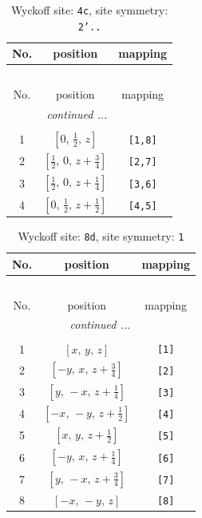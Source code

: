 \documentclass[fleqn,8pt]{jsarticle}
\begin{document}
\renewcommand{\arraystretch}{1.2}
\begin{longtable}{ccc}
\caption{Wyckoff site: {\tt 4c}, site symmetry: {\tt 2'..}}
 \\
 \hline \hline
No. & position & mapping \\ \hline \endfirsthead

\multicolumn{2}{l}{\tablename\ \thetable{}} \\
 \hline \hline
No. & position & mapping \\ \hline \endhead

 \hline \hline
\multicolumn{2}{r}{\footnotesize\it continued ...} \\ \endfoot

 \hline \hline
\multicolumn{2}{r}{} \\ \endlastfoot

1 & $\left[ 0,\, \frac{1}{2},\, z \right]$ & {\tt [1,8]} \\ \hline
2 & $\left[ \frac{1}{2},\, 0,\, z + \frac{3}{4} \right]$ & {\tt [2,7]} \\ \hline
3 & $\left[ \frac{1}{2},\, 0,\, z + \frac{1}{4} \right]$ & {\tt [3,6]} \\ \hline
4 & $\left[ 0,\, \frac{1}{2},\, z + \frac{1}{2} \right]$ & {\tt [4,5]} \\
\end{longtable}
\renewcommand{\arraystretch}{1.2}
\begin{longtable}{ccc}
\caption{Wyckoff site: {\tt 8d}, site symmetry: {\tt 1}}
 \\
 \hline \hline
No. & position & mapping \\ \hline \endfirsthead

\multicolumn{2}{l}{\tablename\ \thetable{}} \\
 \hline \hline
No. & position & mapping \\ \hline \endhead

 \hline \hline
\multicolumn{2}{r}{\footnotesize\it continued ...} \\ \endfoot

 \hline \hline
\multicolumn{2}{r}{} \\ \endlastfoot

1 & $\left[ x,\, y,\, z \right]$ & {\tt [1]} \\ \hline
2 & $\left[ - y,\, x,\, z + \frac{3}{4} \right]$ & {\tt [2]} \\ \hline
3 & $\left[ y,\, - x,\, z + \frac{1}{4} \right]$ & {\tt [3]} \\ \hline
4 & $\left[ - x,\, - y,\, z + \frac{1}{2} \right]$ & {\tt [4]} \\ \hline
5 & $\left[ x,\, y,\, z + \frac{1}{2} \right]$ & {\tt [5]} \\ \hline
6 & $\left[ - y,\, x,\, z + \frac{1}{4} \right]$ & {\tt [6]} \\ \hline
7 & $\left[ y,\, - x,\, z + \frac{3}{4} \right]$ & {\tt [7]} \\ \hline
8 & $\left[ - x,\, - y,\, z \right]$ & {\tt [8]} \\
\end{longtable}
\end{document}
